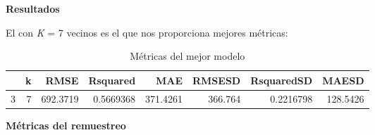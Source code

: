 \documentclass[
]{article}
\begin{document}
\textbf{Resultados}

El con \emph{K} = 7 vecinos es el que nos proporciona mejores métricas:

\begin{table}[H]

\caption{\label{tab:unnamed-chunk-14}Métricas del mejor modelo}
\centering
\begin{tabular}[t]{lrrrrrrr}
\toprule
  & k & RMSE & Rsquared & MAE & RMSESD & RsquaredSD & MAESD\\
\midrule
3 & 7 & 692.3719 & 0.5669368 & 371.4261 & 366.764 & 0.2216798 & 128.5426\\
\bottomrule
\end{tabular}
\end{table}

\textbf{Métricas del remuestreo}
\end{document}
